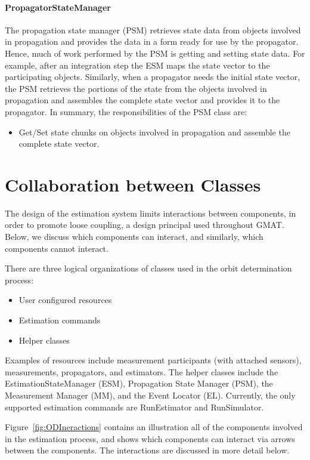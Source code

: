 \paragraph{PropagatorStateManager}  The propagation state manager (PSM) retrieves state data from
objects involved in propagation and provides the data in a form ready for use by the propagator.
Hence, much of work performed by the PSM is getting and setting state data.  For example, after an
integration step the ESM maps the state vector to the participating objects.  Similarly, when a
propagator needs the initial state vector, the PSM retrieves the portions of the state from the
objects involved in propagation and assembles the complete state vector and provides it to the
propagator.  In summary, the responsibilities of the PSM class are:
\begin{itemize}
\item Get/Set state chunks on objects involved in propagation and assemble the complete state
vector.
\end{itemize}

\section{Collaboration between Classes}

The design of the estimation system limits interactions between components, in order to promote
loose coupling, a design principal used throughout GMAT.  Below, we discuss which components can
interact, and similarly, which components cannot interact.

There are three logical organizations of classes used in the orbit determination process:
\begin{itemize}
\item User configured resources
\item Estimation commands
\item Helper classes
\end{itemize}

Examples of resources include measurement participants (with attached sensors), measurements,
propagators, and estimators.  The helper classes include the EstimationStateManager (ESM),
Propagation State Manager (PSM), the Measurement Manager (MM), and the Event Locator (EL).
Currently, the only supported estimation commands are RunEstimator and RunSimulator.

Figure~\ref{fig:ODIneractions} contains an illustration all of the components involved in the
estimation process, and shows which components can interact via arrows between the components.   The
interactions are discussed in more detail below.


